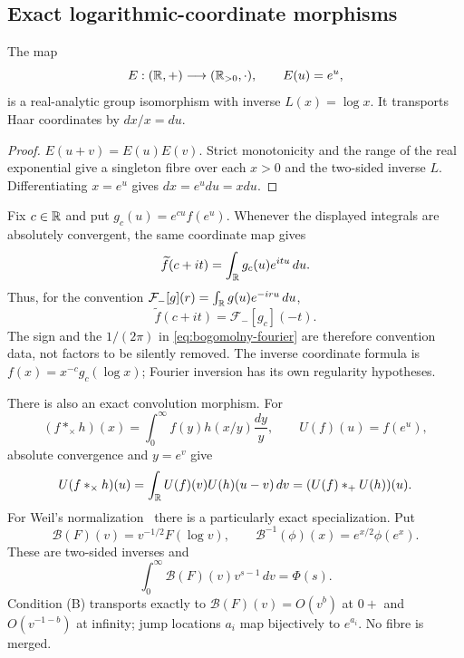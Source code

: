 \subsection{Exact logarithmic-coordinate morphisms}

\begin{proposition}
The map
\[
 E:(\mathbb R,+)\longrightarrow(\mathbb R_{>0},\cdot),\qquad E(u)=e^u,
\]
is a real-analytic group isomorphism with inverse $L(x)=\log x$.  It transports Haar
coordinates by $dx/x=du$.
\end{proposition}
\begin{proof}
$E(u+v)=E(u)E(v)$.  Strict monotonicity and the range of the real exponential give a
singleton fibre over each $x>0$ and the two-sided inverse $L$.  Differentiating
$x=e^u$ gives $dx=e^u du=xdu$.
\end{proof}

Fix $c\in\mathbb R$ and put $g_c(u)=e^{cu}f(e^u)$.  Whenever the displayed integrals are
absolutely convergent, the same coordinate map gives
\begin{equation}
 \widetilde f(c+it)
 =\int_\mathbb R g_c(u)e^{itu}\,du.
 \label{eq:mellin-fourier-interface}
\end{equation}
Thus, for the convention
$\mathcal F_-[g](r)=\int_\mathbb R g(u)e^{-iru}\,du$,
\begin{equation}
 \widetilde f(c+it)=\mathcal F_-[g_c](-t).
 \label{eq:mellin-fourier-sign}
\end{equation}
The sign and the $1/(2\pi)$ in \eqref{eq:bogomolny-fourier} are therefore convention data,
not factors to be silently removed.  The inverse coordinate formula is
$f(x)=x^{-c}g_c(\log x)$; Fourier inversion has its own regularity hypotheses.

There is also an exact convolution morphism.  For
\begin{equation}
 (f*_\times h)(x)=\int_0^\infty f(y)h(x/y)\frac{dy}{y},
 \qquad U(f)(u)=f(e^u),
\end{equation}
absolute convergence and $y=e^v$ give
\begin{equation}
 U(f*_\times h)(u)=\int_\mathbb R U(f)(v)U(h)(u-v)\,dv
 =(U(f)*_+U(h))(u).
 \label{eq:convolution-interface}
\end{equation}
For Weil's normalization~\cite[Collected Papers II, pp.~52--58]{weil1952}
there is a particularly exact specialization.  Put
\begin{equation}
 \mathcal B(F)(v)=v^{-1/2}F(\log v),
 \qquad
 \mathcal B^{-1}(\phi)(x)=e^{x/2}\phi(e^x).
 \label{eq:weil-log-bijection}
\end{equation}
These are two-sided inverses and
\[
 \int_0^\infty\mathcal B(F)(v)v^{s-1}\,dv=\Phi(s).
\]
Condition (B) transports exactly to
$\mathcal B(F)(v)=O(v^b)$ at $0+$ and $O(v^{-1-b})$ at infinity; jump locations
$a_i$ map bijectively to $e^{a_i}$.  No fibre is merged.

